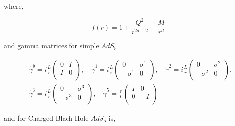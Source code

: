 where,

\begin{equation}
   f(r) = 1 + \frac{Q^2}{r^{2d-2}} - \frac{M}{r^d}
\end{equation}

and gamma matrices for simple $AdS_5$ 

\begin{align} \label{eq:GammaMetricesMinkowski5d}
   &\tilde{\gamma}^0 = i\frac{L}{r}\begin{pmatrix} 0 & I \\ I & 0 \\ \end{pmatrix}, \quad
   \tilde{\gamma}^1  = i\frac{L}{r}\begin{pmatrix} 0 & \sigma^1 \\ -\sigma^1 & 0 \\ \end{pmatrix}, \quad
   \tilde{\gamma}^2  = i\frac{L}{r}\begin{pmatrix} 0 & \sigma^2 \\ -\sigma^2 & 0 \\ \end{pmatrix}, \nonumber\\
   &\tilde{\gamma}^3 = i\frac{L}{r}\begin{pmatrix} 0 & \sigma^3 \\ -\sigma^3 & 0 \\ \end{pmatrix}, \quad
   \tilde{\gamma}^5  =  \frac{r}{L}\begin{pmatrix} I & 0 \\ 0 & -I \\ \end{pmatrix}
\end{align}

and for Charged Blach Hole $AdS_5$ is,

